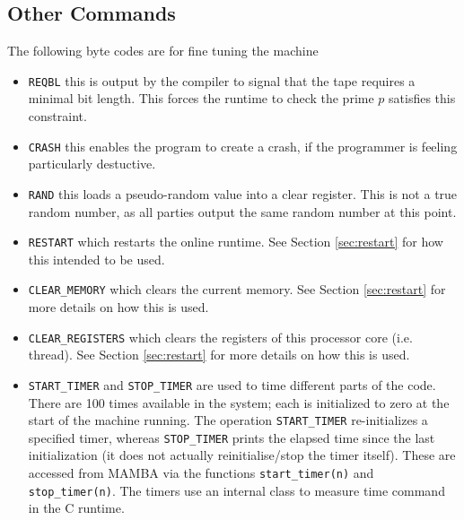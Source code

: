 \subsection{Other Commands}
The following byte codes are for fine tuning the machine
\begin{itemize}
\item \verb+REQBL+ this is output by the compiler to signal that
the tape requires a minimal bit length. This forces the runtime
to check the prime $p$ satisfies this constraint.
\item \verb+CRASH+ this enables the program to create a crash,
if the programmer is feeling particularly destuctive.
\item \verb+RAND+ this loads a pseudo-random value into a
clear register. This is not a true random number, as all
parties output the same random number at this point.
\item \verb+RESTART+ which restarts the online runtime.
See Section \ref{sec:restart} for how this intended to be used.
\item \verb+CLEAR_MEMORY+ which clears the current memory.
See Section \ref{sec:restart} for more details on how this is used.
\item \verb+CLEAR_REGISTERS+ which clears the registers of this processor core (i.e. thread).
See Section \ref{sec:restart} for more details on how this is used.
\item \verb+START_TIMER+ and \verb+STOP_TIMER+ are used to time different
parts of the code. There are 100 times available in the system;
each is initialized to zero at the start of the machine running.
The operation \verb+START_TIMER+ re-initializes a specified timer,
whereas \verb+STOP_TIMER+ prints the elapsed time since the last
initialization (it does not actually reinitialise/stop the timer itself).
These are accessed from MAMBA via the functions
\verb+start_timer(n)+ and \verb+stop_timer(n)+.
The timers use an internal class to measure time command in the C runtime. 
\end{itemize}



